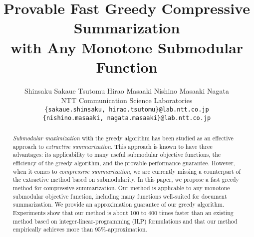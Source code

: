 \documentclass[11pt,a4paper]{article}
\title{Provable Fast Greedy Compressive Summarization\\with Any Monotone Submodular Function}
\author{
	Shinsaku Sakaue \quad Tsutomu Hirao \quad Masaaki Nishino \quad Masaaki Nagata\\
	 NTT Communication Science Laboratories \\
	 {\tt \{sakaue.shinsaku, hirao.tsutomu\}@lab.ntt.co.jp} \\
	 {\tt \{nishino.masaaki, nagata.masaaki\}@lab.ntt.co.jp}
	\\}
\date{}
\begin{document}
	\maketitle
	\begin{abstract} 
		{\it Submodular maximization} with the greedy algorithm has been studied as an effective approach to {\it extractive summarization}. This approach is known to have three advantages: its applicability to many useful submodular objective functions, the efficiency of the greedy algorithm, and the provable performance guarantee. However, when it comes to {\it compressive summarization}, we are currently missing a counterpart of the extractive method based on submodularity. In this paper, we propose a fast greedy method for compressive summarization. Our method is applicable to any {monotone submodular} objective function, including many functions well-suited for document summarization. We provide an approximation guarantee of our greedy algorithm. Experiments show that our method is about 100 to 400 times faster than an existing method based on integer-linear-programming (ILP) formulations and that our method empirically achieves more than $95$\%-approximation. 
	\end{abstract}
	
	\newcommand{\Td}{{\bf T}} %
	\newcommand{\rd}{{\bf r}} %
	\newcommand{\Ts}{{T}} %
	\newcommand{\rs}{r} %
	\newcommand{\stkp}{\text{STKP}}
	\newcommand{\scskp}{\text{SCSKP}}
	
	\newcommand{\nl}{\lambda} %
	\newcommand{\ns}{N} %
	
	\renewcommand{\d}{d} %
	\renewcommand{\L}{L} %
	\renewcommand{\l}{\ell} %
	
	\newcommand{\qsub}[1]{q_{{#1}}}
	\newcommand{\qhsub}[1]{\qh_{{#1}}}
	\newcommand{\zbz}{Z^* - Z}
	
	\newcommand{\rouge}{\text{R{\small OUGE}}}
	\newcommand{\rougei}[1]{\text{$\rouge_{#1}$}}
	
\end{document}
